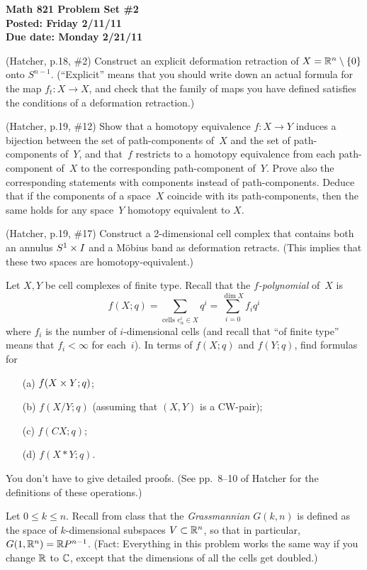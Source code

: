 
\usepackage{youngtab}

\thispagestyle{empty}
{\bf Math 821 Problem Set \#2\\
Posted: Friday 2/11/11\\
Due date: Monday 2/21/11}

\prob (Hatcher, p.18, \#2)
Construct an explicit deformation retraction of $X=\mathbb{R}^n\setminus\{0\}$
onto $S^{n-1}$.  (``Explicit'' means that you should write down an 
actual formula for the map $f_t:X\to X$, and check that the family of 
maps you have defined satisfies the conditions of a deformation 
retraction.)

\prob (Hatcher, p.19, \#12)
Show that a homotopy equivalence $f:X\to Y$ induces a bijection 
between the set of path-components of~$X$ and the set of path-components 
of~$Y$, and that~$f$ restricts to a homotopy equivalence from each 
path-component of~$X$ to the corresponding path-component of~$Y$. Prove 
also the corresponding statements with components instead of 
path-components. Deduce that if the components of a space~$X$ coincide 
with its path-components, then the same holds for any space~$Y$ homotopy 
equivalent to $X$.

\prob (Hatcher, p.19, \#17)
Construct a 2-dimensional cell complex that contains both an
annulus $S^1\times I$ and a M\"obius band as deformation retracts.
(This implies that these two spaces are homotopy-equivalent.)

\prob Let $X,Y$ be cell complexes of finite type.  Recall that the
\emph{$f$-polynomial} of~$X$ is
$$f(X;q) = \sum_{\text{cells } e_\alpha^i\in X} q^i
= \sum_{i=0}^{\dim X} f_i q^i$$
where $f_i$ is the number of $i$-dimensional cells (and recall that ``of finite type'' means that $f_i<\infty$ for each~$i$).
In terms of $f(X;q)$ and $f(Y;q)$,
find formulas for
\begin{enumerate}
\item[(a)] $f(X\times Y;q)$;
\item[(b)] $f(X/Y;q)$ (assuming that $(X,Y)$ is a CW-pair);
\item[(c)] $f(CX;q)$;
\item[(d)] $f(X*Y;q)$.
\end{enumerate}
You don't have to give detailed proofs.
(See pp.~8--10 of Hatcher for the definitions of these operations.)

\prob Let $0\leq k\leq n$.
Recall from class that the \emph{Grassmannian} $G(k,n)$
is defined as the space of $k$-dimensional subspaces $V\subset\mathbb{R}^n$,
so that in particular, $G(1,\mathbb{R}^n)=\mathbb{R} P^{n-1}$.  (Fact: Everything in
this problem works the same way if you change $\mathbb{R}$ to $\mathbb{C}$, except
that the dimensions of all the cells get doubled.)

